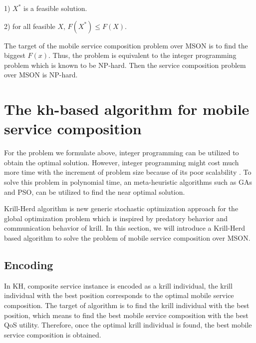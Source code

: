 \documentclass[10pt,journal,compsoc]{IEEEtran}
\begin{document}
1) $X^*$ is a feasible solution.

​2) for all feasible $X$, $F(X^*) \le F(X)$. 

The target of the mobile service composition problem over MSON is to find the biggest $F(x)$. Thus, the problem is equivalent to the integer programming problem which is known to be NP-hard. Then the service composition problem over MSON is NP-hard.

\section{The kh-based algorithm for mobile service composition}
For the problem we formulate above, integer programming can be utilized to obtain the optimal solution. However, integer programming might cost much more time with the increment of problem size because of its poor scalability \cite{nemhauser1988integer}. To solve this problem in polynomial time, an meta-heuristic algorithms such as GAs and PSO, can be utilized to find the near optimal solution.

Krill-Herd algorithm \cite{gandomi2012krill} is new generic stochastic optimization approach for the global optimization problem which is inspired by predatory behavior and communication behavior of krill. 
In this section, we will introduce a Krill-Herd based algorithm to solve the problem of mobile service composition over MSON.


\subsection{Encoding}
In KH, composite service instance is encoded as a krill individual, the krill individual with the best position corresponds to the optimal mobile service composition. The target of algorithm is to find the krill individual with the best position, which means to find the best mobile service composition with the best QoS utility. Therefore, once the optimal krill individual is found, the best mobile service composition is obtained.
\end{document}
